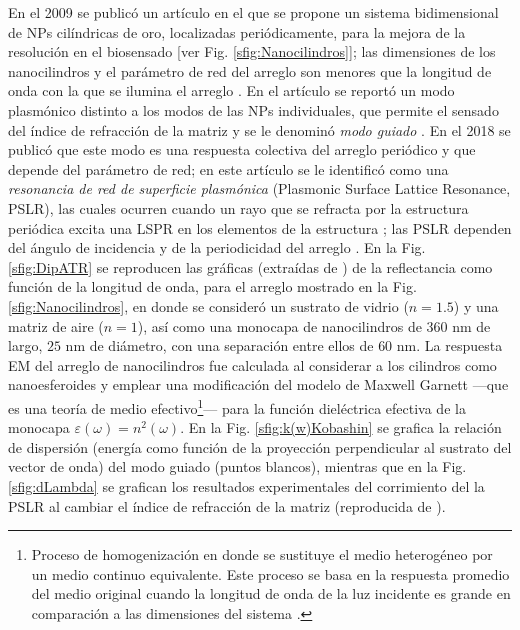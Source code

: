 En el 2009 se public\'o un art\'iculo \cite{kabashin2009plasmonic} en el que se propone un sistema bidimensional de NPs cilíndricas de oro, localizadas periódicamente, para la mejora de la resoluci\'on  en el biosensado [ver Fig. \ref{sfig:Nanocilindros}]; las dimensiones de los nanocilindros y el parámetro de red del arreglo son menores que la longitud de onda con la que se ilumina el arreglo \cite{kabashin2009plasmonic}.  En el artículo se reportó un modo plasmónico distinto a los modos de las NPs individuales, que permite el sensado del índice de refracción de la matriz y se le denominó \textit{modo guiado} \cite{kabashin2009plasmonic}.  En el 2018 se publicó que este modo es una respuesta colectiva del arreglo periódico \cite{danilov2018ultra} y que depende del parámetro de red; en este artículo se le identificó como una \emph{resonancia de red de superficie plasmónica} (Plasmonic Surface Lattice Resonance, PSLR), las cuales ocurren cuando un rayo que se refracta por la estructura periódica excita una LSPR en los elementos de la estructura \cite{vakevainen2013plasmonic}; las PSLR dependen del  ángulo de incidencia y de la periodicidad del arreglo \cite{danilov2018ultra}. En la Fig. \ref{sfig:DipATR} se reproducen las gráficas (extraídas de \cite{kabashin2009plasmonic}) de la reflectancia como función de la longitud de onda, para el arreglo mostrado en la Fig.  \ref{sfig:Nanocilindros}, en donde se consideró un sustrato de vidrio ($n=1.5$) y una matriz de aire ($n=1$), así como una monocapa de nanocilindros de $360$ nm de largo, $25$ nm de diámetro, con una separación entre ellos de $60$ nm. La respuesta EM del arreglo de nanocilindros   fue calculada al considerar a los cilindros como nanoesferoides y emplear una modificación del modelo de Maxwell Garnett \cite{atkinson2006anisotropic} ---que es una teoría de medio efectivo\footnote{Proceso de homogenización en donde se sustituye el medio heterogéneo por un medio continuo equivalente.  Este proceso se basa en la respuesta promedio del medio original cuando la longitud de onda de la luz incidente es grande en comparación a las dimensiones del sistema \cite{sihvola1999mixing}.}--- para la función dieléctrica efectiva de la monocapa $\varepsilon(\omega) = n^2 (\omega)$. En la Fig. \ref{sfig:k(w)Kobashin} se grafica la relación de dispersión  (energía como función de la  proyección perpendicular al sustrato del vector de onda)  del modo guiado (puntos blancos), mientras que en la Fig.  \ref{sfig:dLambda} se grafican los resultados experimentales del corrimiento del la PSLR al cambiar el índice de refracción de la matriz (reproducida de \cite{danilov2018ultra}).

